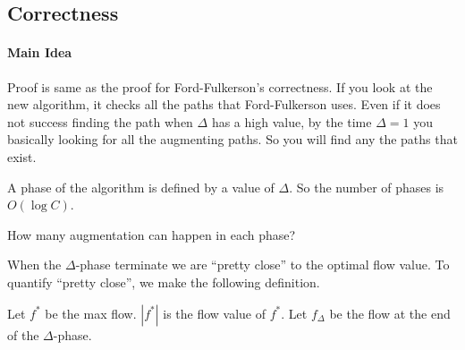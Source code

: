 \subsection{Correctness}
\paragraph{Main Idea} Proof is same as the proof for Ford-Fulkerson's correctness. If you look at the new algorithm, it checks all the paths that Ford-Fulkerson uses. Even if it does not success finding the path when $\Delta$ has a high value, by the time $\Delta = 1$ you basically looking for all the augmenting paths. So you will find any the paths that exist.
\begin{definition}
	A phase of the algorithm is defined by a value of $\Delta$. So the number of phases is $O(\log C)$.
\end{definition}

How many augmentation can happen in each phase? 

When the $\Delta$-phase terminate we are ``pretty close'' to the optimal flow value. To quantify ``pretty close'', we make the following definition. 

\begin{definition}
	Let $f^*$ be the max flow. $|f^*|$ is the flow value of $f^*$. Let $f_{\Delta}$ be the flow at the end of the $\Delta$-phase. 
\end{definition}

